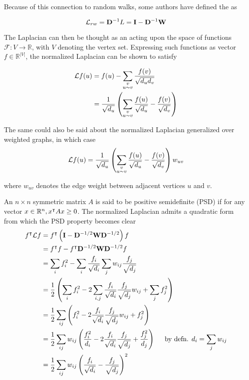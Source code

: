 Because of this connection to random walks, some authors have defined the  as

\begin{equation}
\mathbf{\mathcal{L}}_{rw} = \mathbf{D}^{-1} L = \mathbf{I} - \mathbf{D}^{-1} \mathbf{W}
\end{equation}

The Laplacian can then be thought as an  acting upon the space of
functions $\mathcal{F} : V \to \mathbb{R}$, with $V$ denoting the vertex set.
Expressing such functions as vector $f \in \mathbb{R}^{|V|}$, the normalized Laplacian
can be shown to satisfy
 
\begin{align}
\mathcal{L}f(u) &= f(u) - \sum_{\substack{ v \\ u \sim v}} \frac{f(v)}{\sqrt{d_ud_v}} \notag \\
 &= \frac{1}{\sqrt{d_u}} \left( \sum_{\substack{ v \\ u \sim v}} \frac{f(u)}{\sqrt{d_u}} - \frac{f(v)}{\sqrt{d_v}} \right)
\label{eq:difference-operator}
\end{align}

The same could also be said about the normalized Laplacian generalized over weighted
graphs, in which case
\begin{equation}
\mathbf{\mathcal{L}} f (u) = \frac{1}{\sqrt{d_u}} \left( \sum_{\substack{ v \\ u \sim v}} \frac{f(u)}{\sqrt{d_u}} - \frac{f(v)}{\sqrt{d_v}} \right) w_{uv}
\end{equation}

where $w_{uv}$ denotes the edge weight between adjacent vertices $u$ and $v$. 

An $n \times  n$ symmetric matrix $A$ is said to be positive semidefinite (PSD) if for any vector $x \in \mathbb{R}^n, x^\intercal A x \geq 0$.  The normalized Laplacian admits a quadratic form from which the PSD property becomes clear
\begin{align}
f^\intercal \mathbf{\mathcal{L}} f &= f^\intercal \left( \mathbf{I} - \mathbf{D}^{-1/2} \mathbf{W} \mathbf{D}^{-1/2} \right) f \notag \\
&= f^\intercal f - f^\intercal \mathbf{D}^{-1/2} \mathbf{W} \mathbf{D}^{-1/2} f \notag \notag \\
&= \sum_{i} f_i^2 - \sum_{i} \frac{f_i}{\sqrt{d_i}} \sum_j w_{ij} \frac{f_j}{\sqrt{d_j}} \notag \\
&= \frac{1}{2} \left( \sum_i f_i^2 - 2 \sum_{i,j} \frac{f_i}{\sqrt{d_i}} \frac{f_j}{\sqrt{d_j}} w_{ij} + \sum_j f_j^2 \right) \notag \\
&= \frac{1}{2} \sum_{ij} \left(  f_i^2 -2\frac{f_i}{\sqrt{d_i}}\frac{f_j}{\sqrt{d_j}} w_{ij}  + f_j^2 \right) \notag \\
&=  \frac{1}{2} \sum_{ij} w_{ij} \left(  \frac{f_i^2}{d_i} -2\frac{f_i}{\sqrt{d_i}}\frac{f_j}{\sqrt{d_j}} + \frac{f_j^2}{d_j} \right) \hspace{5mm} \text{by defn. $d_i = \sum_j w_{ij}$} \notag \\
&= \frac{1}{2} \sum_{ij} w_{ij} \left( \frac{f_i}{\sqrt{d_i}} - \frac{f_j}{\sqrt{d_j}} \right)^2
\label{eq:quadratic-form}
\end{align}

